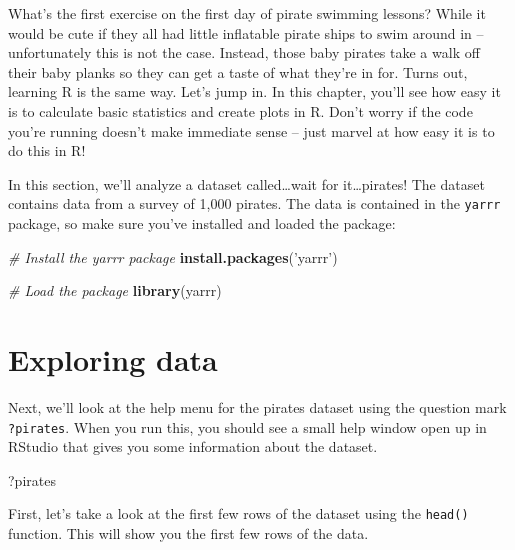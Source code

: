 \documentclass[]{book}
\newenvironment{Shaded}{\begin{snugshade}}{\end{snugshade}}
\newcommand{\KeywordTok}[1]{\textcolor[rgb]{0.13,0.29,0.53}{\textbf{#1}}}
\newcommand{\StringTok}[1]{\textcolor[rgb]{0.31,0.60,0.02}{#1}}
\newcommand{\CommentTok}[1]{\textcolor[rgb]{0.56,0.35,0.01}{\textit{#1}}}
\newcommand{\NormalTok}[1]{#1}
\theoremstyle{definition}
\theoremstyle{definition}
\theoremstyle{remark}
\begin{document}
What's the first exercise on the first day of pirate swimming lessons?
While it would be cute if they all had little inflatable pirate ships to
swim around in -- unfortunately this is not the case. Instead, those
baby pirates take a walk off their baby planks so they can get a taste
of what they're in for. Turns out, learning R is the same way. Let's
jump in. In this chapter, you'll see how easy it is to calculate basic
statistics and create plots in R. Don't worry if the code you're running
doesn't make immediate sense -- just marvel at how easy it is to do this
in R!

In this section, we'll analyze a dataset called\ldots{}wait for
it\ldots{}pirates! The dataset contains data from a survey of 1,000
pirates. The data is contained in the \texttt{yarrr} package, so make
sure you've installed and loaded the package:

\begin{Shaded}
\begin{Highlighting}[]
\CommentTok{# Install the yarrr package}
\KeywordTok{install.packages}\NormalTok{(}\StringTok{'yarrr'}\NormalTok{)}

\CommentTok{# Load the package}
\KeywordTok{library}\NormalTok{(yarrr)}
\end{Highlighting}
\end{Shaded}

\section{Exploring data}\label{exploring-data}

Next, we'll look at the help menu for the pirates dataset using the
question mark \texttt{?pirates}. When you run this, you should see a
small help window open up in RStudio that gives you some information
about the dataset.

\begin{Shaded}
\begin{Highlighting}[]
\NormalTok{?pirates}
\end{Highlighting}
\end{Shaded}

First, let's take a look at the first few rows of the dataset using the
\texttt{head()} function. This will show you the first few rows of the
data.
\end{document}
